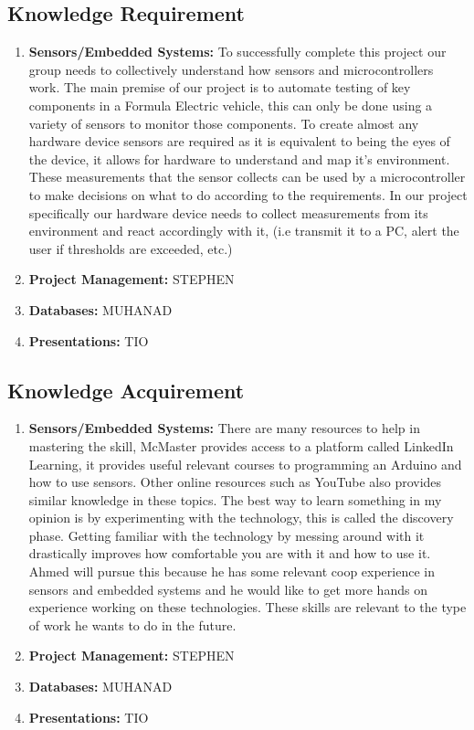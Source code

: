 \documentclass[12pt]{article}
\begin{document}
\subsection{Knowledge Requirement}
\begin{enumerate}
  \item \textbf{Sensors/Embedded Systems:} To successfully complete this project our group needs to collectively understand how sensors and microcontrollers work. The main premise of our project is to automate testing of key components in a Formula Electric vehicle, this can only be done using a variety of sensors to monitor those components. To create almost any hardware device sensors are required as it is equivalent to being the eyes of the device, it allows for hardware to understand and map it's environment. These measurements that the sensor collects can be used by a microcontroller to make decisions on what to do according to the requirements. In our project specifically our hardware device needs to collect measurements from its environment and react accordingly with it, (i.e transmit it to a PC, alert the user if thresholds are exceeded, etc.)
  
  \item \textbf{Project Management:} STEPHEN
  
  \item \textbf{Databases:} MUHANAD
  
  \item \textbf{Presentations:} TIO
  
\end{enumerate}


\subsection{Knowledge Acquirement }

\begin{enumerate}
  \item \textbf{Sensors/Embedded Systems:} There are many resources to help in mastering the skill, McMaster provides access to a platform called LinkedIn Learning, it provides useful relevant courses to programming an Arduino and how to use sensors. Other online resources such as YouTube also provides similar knowledge in these topics. The best way to learn something in my opinion is by experimenting with the technology, this is called the discovery phase. Getting familiar with the technology by messing around with it drastically improves how comfortable you are with it and how to use it. Ahmed will pursue this because he has some relevant coop experience in sensors and embedded systems and he would like to get more hands on experience working on these technologies. These skills are relevant to the type of work he wants to do in the future.
  
  \item \textbf{Project Management:} STEPHEN
  
  \item \textbf{Databases:} MUHANAD
  
  \item \textbf{Presentations:} TIO
  
\end{enumerate}
\end{document}
